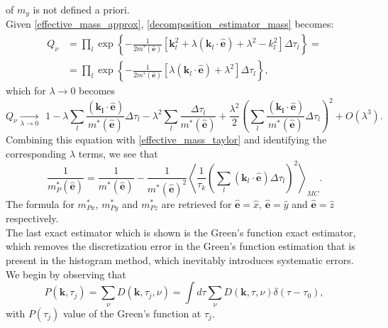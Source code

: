 of $m_y$ is not defined a priori.\\
Given \ref{effective_mass_approx}, \ref{decomposition_estimator_mass} becomes:
\begin{equation}
\begin{split}
    Q_\nu&=\prod_l\exp\left\{-\frac{1}{2m^*(\hat{\mathbf{e}})}\left[\mathbf{k}^2_l+\lambda(\mathbf{k}_l\cdot\hat{\mathbf{e}})+\lambda^2-k^2_l\right]\Delta\tau_l\right\}=\\
    &=\prod_l\exp\left\{-\frac{1}{2m^*(\hat{\mathbf{e}})}\left[\lambda(\mathbf{k}_l\cdot\hat{\mathbf{e}})+\lambda^2\right]\Delta\tau_l\right\},
\end{split}
\end{equation}
which for $\lambda\to 0$ becomes
\begin{equation}
    Q_\nu\xrightarrow[\lambda\to0]{}\hspace{5pt}1-\lambda\sum_l\frac{(\mathbf{k_l\cdot\hat{\mathbf{e}}})}{m^*(\hat{\mathbf{e}})}\Delta\tau_l - \lambda^2\sum_l\frac{\Delta\tau_l}{m^*(\hat{\mathbf{e}})}+\frac{\lambda^2}{2}\left(\sum_l\frac{(\mathbf{k_l\cdot\hat{\mathbf{e}}})}{m^*(\hat{\mathbf{e}})}\Delta\tau_l\right)^2+O(\lambda^3).
\end{equation}
Combining this equation with \ref{effective_mass_taylor} and identifying the corresponding $\lambda$ terms, we see that
\begin{equation}
    \frac{1}{m^*_P(\hat{\mathbf{e}})}=\frac{1}{m^*(\hat{\mathbf{e}})} - \frac{1}{m^*(\hat{\mathbf{e}})^2}\left \langle \frac{1}{\tau_k}\left(\sum_l(\mathbf{k}_l\cdot\hat{\mathbf{e}})\Delta\tau_l\right)^2   \right \rangle_{MC}.
\end{equation}
The formula for $m_{Px}^*$, $m_{Py}^*$ and $m_{Pz}^*$ are retrieved for $\hat{\mathbf{e}}=\hat{x}$, $\hat{\mathbf{e}}=\hat{y}$ and $\hat{\mathbf{e}}=\hat{z}$ respectively.\\
The last exact estimator which is shown is the Green's function exact estimator, which removes the discretization error in the Green's function 
estimation that is present in the histogram method, which inevitably introduces systematic errors.\\
We begin by observing that \cite{mishchenko2000diagrammatic}
\begin{equation}
    P(\mathbf{k},\tau_j)=\sum_\nu D(\mathbf{k},\tau_j,\nu)=\int d\tau \sum_\nu D(\mathbf{k},\tau,\nu)\delta(\tau-\tau_0),
\end{equation}
with $P(\tau_j)$ value of the Green's function at $\tau_j$.\\
